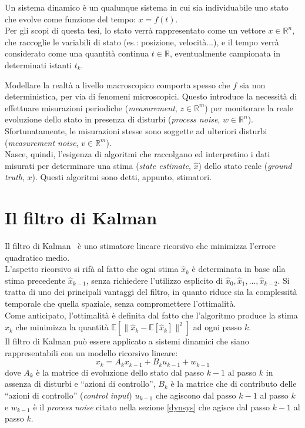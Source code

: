 \documentclass[12pt,a4paper,openright,twoside]{book}
\begin{document}
Un sistema dinamico è un qualunque sistema in cui sia individuabile uno stato che evolve come funzione del tempo: $x=f(t)$. \\
Per gli scopi di questa tesi, lo stato verrà rappresentato come un vettore $x\in\mathbb{R}^n$, che raccoglie le variabili di stato (es.: posizione, velocità...), e il tempo verrà considerato come una quantità continua $t\in\mathbb{R}$, eventualmente campionata in determinati istanti $t_k$.

Modellare la realtà a livello macroscopico comporta spesso che $f$ sia non deterministica, per via di fenomeni microscopici. Questo introduce la necessità di effettuare misurazioni periodiche (\textit{measurement}, $z\in\mathbb{R}^m$) per monitorare la reale evoluzione dello stato in presenza di disturbi (\textit{process noise}, $w\in\mathbb{R}^n$). \\
Sfortunatamente, le misurazioni stesse sono soggette ad ulteriori disturbi (\textit{measurement noise}, $v\in\mathbb{R}^m$). \\
Nasce, quindi, l'esigenza di algoritmi che raccolgano ed interpretino i dati misurati per determinare una stima (\textit{state estimate}, $\hat{x}$) dello stato reale (\textit{ground truth}, $x$). Questi algoritmi sono detti, appunto, stimatori.

\section{Il filtro di Kalman}

Il filtro di Kalman~\cite{10.1115/1.3662552} è uno stimatore lineare ricorsivo che minimizza l'errore quadratico medio. \\
L'aspetto ricorsivo si rifà al fatto che ogni stima $\hat{x}_k$ è determinata in base alla stima precedente $\hat{x}_{k-1}$, senza richiedere l'utilizzo esplicito di $\hat{x}_0,\hat{x}_1,...,\hat{x}_{k-2}$. Si tratta di uno dei principali vantaggi del filtro, in quanto riduce sia la complessità temporale che quella spaziale, senza compromettere l'ottimalità. \\
Come anticipato, l'ottimalità è definita dal fatto che l'algoritmo produce la stima $\hat{x}_k$ che minimizza la quantità $\mathbb{E}[\lVert\hat{x}_k-\mathbb{E}[\hat{x}_k]\rVert^2]$ ad ogni passo $k$. \\

Il filtro di Kalman può essere applicato a sistemi dinamici che siano rappresentabili con un modello ricorsivo lineare:
$$x_k=A_kx_{k-1}+B_ku_{k-1}+w_{k-1}$$
dove $A_k$ è la matrice di evoluzione dello stato dal passo $k-1$ al passo $k$ in assenza di disturbi e ``azioni di controllo'', $B_k$ è la matrice che di contributo delle ``azioni di controllo'' (\textit{control input}) $u_{k-1}$ che agiscono dal passo $k-1$ al passo $k$ e $w_{k-1}$ è il \textit{process noise} citato nella sezione \ref{dynsys} che agisce dal passo $k-1$ al passo $k$.
\end{document}
